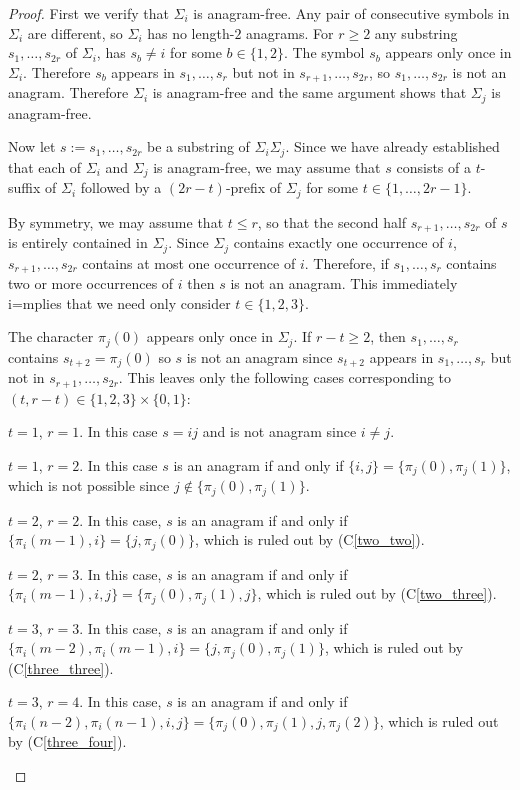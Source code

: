 \documentclass[kpfonts]{patmorin}
\newcommand{\condref}[1]{(C\ref{#1})}
\begin{document}
\begin{proof}
    First we verify that $\Sigma_i$ is anagram-free. Any pair of consecutive symbols in $\Sigma_i$ are different, so  $\Sigma_i$ has no length-$2$ anagrams. For $r\ge 2$ any substring $s_1,\ldots,s_{2r}$ of $\Sigma_i$, has $s_b\neq i$ for some $b\in\{1,2\}$.  The symbol $s_b$ appears only once in $\Sigma_i$.  Therefore $s_b$ appears in $s_1,\ldots,s_r$ but not in $s_{r+1},\ldots,s_{2r}$, so $s_1,\ldots,s_{2r}$ is not an anagram. Therefore $\Sigma_i$ is anagram-free and the same argument shows that $\Sigma_j$ is anagram-free.

    Now let $s:=s_1,\ldots,s_{2r}$ be a substring of $\Sigma_i\Sigma_j$.  Since we have already established that each of $\Sigma_i$ and $\Sigma_j$ is anagram-free, we may assume that $s$ consists of a $t$-suffix of $\Sigma_i$ followed by a $(2r-t)$-prefix of $\Sigma_j$ for some $t\in\{1,\ldots,2r-1\}$.

    By symmetry, we may assume that $t\le r$, so that the second half $s_{r+1},\ldots,s_{2r}$ of $s$ is entirely contained in $\Sigma_j$.    Since $\Sigma_j$ contains exactly one occurrence of $i$, $s_{r+1},\ldots,s_{2r}$ contains at most one occurrence of $i$.  Therefore, if $s_1,\ldots,s_r$ contains two or more occurrences of $i$ then $s$ is not an anagram.  This immediately i=mplies that we need only consider $t\in\{1,2,3\}$.

    The character $\pi_{j}(0)$ appears only once in $\Sigma_j$.  If $r-t\ge 2$, then $s_1,\ldots,s_r$ contains $s_{t+2}=\pi_j(0)$ so $s$ is not an anagram since $s_{t+2}$ appears in $s_1,\ldots,s_r$ but not in $s_{r+1},\ldots,s_{2r}$.  This leaves only the following cases corresponding to $(t,r-t)\in\{1,2,3\}\times\{0,1\}$:

    \begin{compactitem}
        \item $t=1$, $r=1$.  In this case $s=ij$ and is not anagram since $i\neq j$.
        \item $t=1$, $r=2$. In this case $s$ is an anagram if and only if $\{i,j\}=\{\pi_j(0),\pi_j(1)\}$, which is not possible since $j\not\in\{\pi_j(0),\pi_j(1)\}$.
        \item $t=2$, $r=2$.  In this case, $s$ is an anagram if and only if $\{\pi_{i}(m-1),i\}=\{j,\pi_j(0)\}$, which is ruled out by \condref{two_two}.
        \item $t=2$, $r=3$. In this case, $s$ is an anagram if and only if $\{\pi_i(m-1),i,j\} = \{\pi_j(0),\pi_j(1),j\}$, which is ruled out by \condref{two_three}.
        \item $t=3$, $r=3$. In this case, $s$ is an anagram if and only if $\{\pi_i(m-2),\pi_i(m-1),i\}=\{j,\pi_j(0),\pi_j(1)\}$, which is ruled out by \condref{three_three}.
        \item $t=3$, $r=4$. In this case, $s$ is an anagram if and only if $\{\pi_i(n-2),\pi_i(n-1),i,j\}=\{\pi_j(0),\pi_j(1),j,\pi_j(2)\}$, which is ruled out by \condref{three_four}. \qedhere
    \end{compactitem}
\end{proof}
\end{document}
